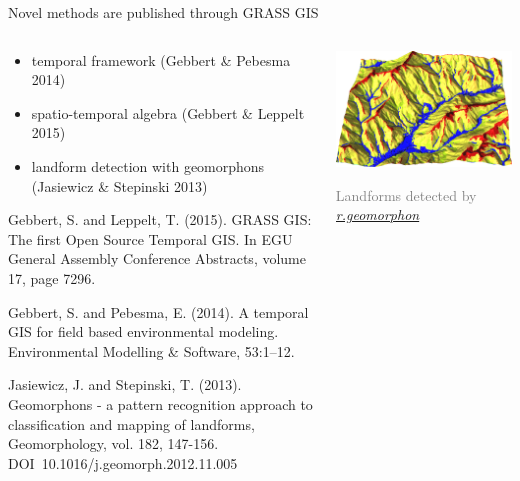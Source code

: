 \documentclass[xcolor={dvipsnames,usenames},beamer,aspectratio=169]{beamer}
\newcommand{\gmodule}[1]{\href{http://grass.osgeo.org/grass74/manuals/#1.html}{\emph{#1}}}
\begin{document}
\begin{frame}{Novel methods are published through GRASS GIS}

\begin{columns}
\begin{column}{0.5\textwidth}

\begin{itemize}
  \item temporal framework (Gebbert \& Pebesma 2014)
  \item spatio-temporal algebra (Gebbert \& Leppelt 2015)
  \item landform detection with geomorphons (Jasiewicz \& Stepinski 2013)
\end{itemize}

\bigskip
\footnoterule
\tiny

Gebbert, S. and Leppelt, T. (2015). GRASS GIS: The first Open Source Temporal GIS. In EGU General Assembly Conference Abstracts, volume 17, page 7296.

Gebbert, S. and Pebesma, E. (2014). A temporal GIS for field based environmental modeling. Environmental Modelling \& Software, 53:1–12.

Jasiewicz, J. and Stepinski, T. (2013). Geomorphons - a pattern recognition approach to classification and mapping of landforms, Geomorphology, vol. 182, 147-156. DOI~10.1016/j.geomorph.2012.11.005

\end{column}
\begin{column}{0.5\textwidth}
\centering
\includegraphics[width=\textwidth]{geomorphon_3d}

\textcolor{gray}{
\footnotesize
Landforms detected by \gmodule{r.geomorphon}
}

\end{column}
\end{columns}

\end{frame}
\end{document}
